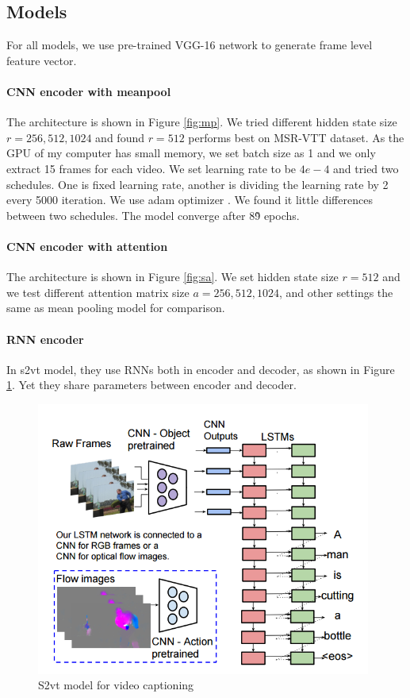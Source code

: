 \subsection{Models}
For all models, we use pre-trained VGG-16 \cite{simonyan2014very} network to generate frame level feature vector.
\paragraph{CNN encoder with meanpool}
The architecture is shown in Figure \ref{fig:mp}. We tried different hidden state size $r=256,512,1024$ and found $r=512$ performs best on MSR-VTT dataset. As the GPU of my computer has small memory, we set batch size as 1 and we only extract 15 frames for each video. We set learning rate to be $4e-4$ and tried two schedules. One is fixed learning rate, another is dividing the learning rate by 2 every 5000 iteration. We use adam optimizer \cite{Kingma2014Adam}. We found it little differences between two schedules. The model converge after 8\~9 epochs.

\paragraph{CNN encoder with attention}
The architecture is shown in Figure \ref{fig:sa}. We set hidden state size $r=512$ and we test different attention matrix size $a=256,512,1024$, and other settings the same as mean pooling model for comparison.

\paragraph{RNN encoder}
In s2vt \cite{venugopalan2015sequence} model, they use RNNs both in encoder and decoder, as shown in Figure \ref{fig:s2vt}. Yet they share parameters between encoder and decoder.

\begin{figure}
\centering
\includegraphics[width=11cm]{resources/s2vt.png}
\caption{S2vt model for video captioning \cite{venugopalan2015sequence}}
\label{fig:s2vt}
\end{figure}

